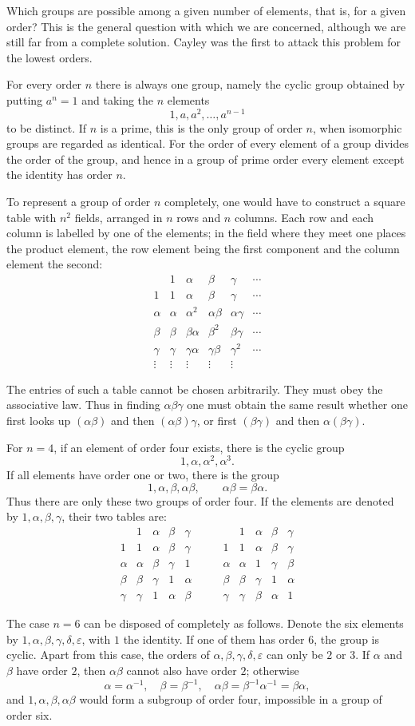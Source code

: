 \documentclass[11pt]{article}
\newcommand{\generalCayleyTable}{%
\[
\begin{array}{c|ccccc}
 & 1 & \alpha & \beta & \gamma & \cdots\\\hline
1&1&\alpha&\beta&\gamma&\cdots\\
\alpha&\alpha&\alpha^2&\alpha\beta&\alpha\gamma&\cdots\\
\beta&\beta&\beta\alpha&\beta^2&\beta\gamma&\cdots\\
\gamma&\gamma&\gamma\alpha&\gamma\beta&\gamma^2&\cdots\\
\vdots&\vdots&\vdots&\vdots&\vdots&
\end{array}
\]
}
\newcommand{\orderFourTables}{%
\[
\begin{array}{c|cccc}
 &1&\alpha&\beta&\gamma\\\hline
1&1&\alpha&\beta&\gamma\\
\alpha&\alpha&\beta&\gamma&1\\
\beta&\beta&\gamma&1&\alpha\\
\gamma&\gamma&1&\alpha&\beta
\end{array}
\qquad
\begin{array}{c|cccc}
 &1&\alpha&\beta&\gamma\\\hline
1&1&\alpha&\beta&\gamma\\
\alpha&\alpha&1&\gamma&\beta\\
\beta&\beta&\gamma&1&\alpha\\
\gamma&\gamma&\beta&\alpha&1
\end{array}
\]
}
\begin{document}
Which groups are possible among a given number of elements, that is, for a given order? This is the general question with which we are concerned, although we are still far from a complete solution. Cayley was the first to attack this problem for the lowest orders.

For every order $n$ there is always one group, namely the cyclic group obtained by putting $a^n=1$ and taking the $n$ elements
\[
1,a,a^2,\ldots,a^{n-1}
\]
to be distinct. If $n$ is a prime, this is the only group of order $n$, when isomorphic groups are regarded as identical. For the order of every element of a group divides the order of the group, and hence in a group of prime order every element except the identity has order $n$.

To represent a group of order $n$ completely, one would have to construct a square table with $n^2$ fields, arranged in $n$ rows and $n$ columns. Each row and each column is labelled by one of the elements; in the field where they meet one places the product element, the row element being the first component and the column element the second:
\generalCayleyTable
The entries of such a table cannot be chosen arbitrarily. They must obey the associative law. Thus in finding $\alpha\beta\gamma$ one must obtain the same result whether one first looks up $(\alpha\beta)$ and then $(\alpha\beta)\gamma$, or first $(\beta\gamma)$ and then $\alpha(\beta\gamma)$.

For $n=4$, if an element of order four exists, there is the cyclic group
\[
1,\alpha,\alpha^2,\alpha^3.
\]
If all elements have order one or two, there is the group
\[
1,\alpha,\beta,\alpha\beta,
\qquad \alpha\beta=\beta\alpha.
\]
Thus there are only these two groups of order four. If the elements are denoted by $1,\alpha,\beta,\gamma$, their two tables are:
\orderFourTables

The case $n=6$ can be disposed of completely as follows. Denote the six elements by $1,\alpha,\beta,\gamma,\delta,\varepsilon$, with $1$ the identity. If one of them has order $6$, the group is cyclic. Apart from this case, the orders of $\alpha,\beta,\gamma,\delta,\varepsilon$ can only be $2$ or $3$. If $\alpha$ and $\beta$ have order $2$, then $\alpha\beta$ cannot also have order $2$; otherwise
\[
\alpha=\alpha^{-1},\quad \beta=\beta^{-1},\quad \alpha\beta=\beta^{-1}\alpha^{-1}=\beta\alpha,
\]
and $1,\alpha,\beta,\alpha\beta$ would form a subgroup of order four, impossible in a group of order six.
\end{document}
